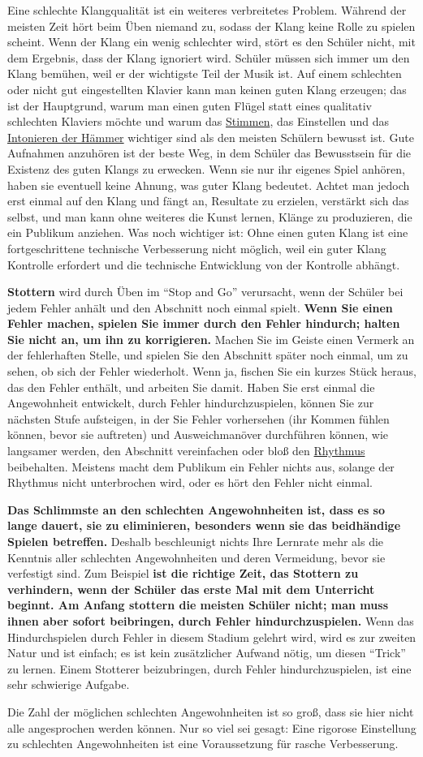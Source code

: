 Eine schlechte Klangqualität ist ein weiteres verbreitetes Problem.
Während der meisten Zeit hört beim Üben niemand zu, sodass der Klang keine Rolle zu spielen scheint.
Wenn der Klang ein wenig schlechter wird, stört es den Schüler nicht, mit dem Ergebnis, dass der Klang ignoriert wird.
Schüler müssen sich immer um den Klang bemühen, weil er der wichtigste Teil der Musik ist.
Auf einem schlechten oder nicht gut eingestellten Klavier kann man keinen guten Klang erzeugen;
das ist der Hauptgrund, warum man einen guten Flügel statt eines qualitativ schlechten Klaviers möchte und warum das \hyperlink{c2_1}{Stimmen}, das Einstellen und das \hyperlink{c2_7_hamm}{Intonieren der Hämmer} wichtiger sind als den meisten Schülern bewusst ist.
Gute Aufnahmen anzuhören ist der beste Weg, in dem Schüler das Bewusstsein für die Existenz des guten Klangs zu erwecken.
Wenn sie nur ihr eigenes Spiel anhören, haben sie eventuell keine Ahnung, was guter Klang bedeutet.
Achtet man jedoch erst einmal auf den Klang und fängt an, Resultate zu erzielen, verstärkt sich das selbst, und man kann ohne weiteres die Kunst lernen, Klänge zu produzieren, die ein Publikum anziehen.
Was noch wichtiger ist: Ohne einen guten Klang ist eine fortgeschrittene technische Verbesserung nicht möglich, weil ein guter Klang Kontrolle erfordert und die technische Entwicklung von der Kontrolle abhängt.

\textbf{Stottern} wird durch Üben im \enquote{Stop and Go} verursacht, wenn der Schüler bei jedem Fehler anhält und den Abschnitt noch einmal spielt.
\textbf{Wenn Sie einen Fehler machen, spielen Sie immer durch den Fehler hindurch; halten Sie nicht an, um ihn zu korrigieren.}
Machen Sie im Geiste einen Vermerk an der fehlerhaften Stelle, und spielen Sie den Abschnitt später noch einmal, um zu sehen, ob sich der Fehler wiederholt.
Wenn ja, fischen Sie ein kurzes Stück heraus, das den Fehler enthält, und arbeiten Sie damit.
Haben Sie erst einmal die Angewohnheit entwickelt, durch Fehler hindurchzuspielen, können Sie zur nächsten Stufe aufsteigen, in der Sie Fehler vorhersehen (ihr Kommen fühlen können, bevor sie auftreten) und Ausweichmanöver durchführen können, wie langsamer werden, den Abschnitt vereinfachen oder bloß den \hyperlink{c1iii1b}{Rhythmus} beibehalten.
Meistens macht dem Publikum ein Fehler nichts aus, solange der Rhythmus nicht unterbrochen wird, oder es hört den Fehler nicht einmal.

\textbf{Das Schlimmste an den schlechten Angewohnheiten ist, dass es so lange dauert, sie zu eliminieren, besonders wenn sie das beidhändige Spielen betreffen.}
Deshalb beschleunigt nichts Ihre Lernrate mehr als die Kenntnis aller schlechten Angewohnheiten und deren Vermeidung, bevor sie verfestigt sind.
Zum Beispiel \textbf{ist die richtige Zeit, das Stottern zu verhindern, wenn der Schüler das erste Mal mit dem Unterricht beginnt.
Am Anfang stottern die meisten Schüler nicht;
man muss ihnen aber sofort beibringen, durch Fehler hindurchzuspielen.}
Wenn das Hindurchspielen durch Fehler in diesem Stadium gelehrt wird, wird es zur zweiten Natur und ist einfach;
es ist kein zusätzlicher Aufwand nötig, um diesen \enquote{Trick} zu lernen.
Einem Stotterer beizubringen, durch Fehler hindurchzuspielen, ist eine sehr schwierige Aufgabe.

Die Zahl der möglichen schlechten Angewohnheiten ist so groß, dass sie hier nicht alle angesprochen werden können.
Nur so viel sei gesagt: Eine rigorose Einstellung zu schlechten Angewohnheiten ist eine Voraussetzung für rasche Verbesserung.



